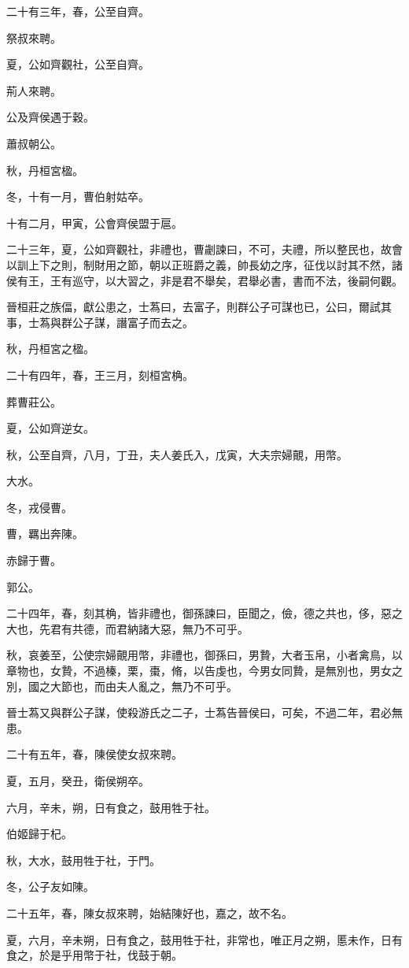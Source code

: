 \begin{pinyinscope}
二十有三年，春，公至自齊。

祭叔來聘。

夏，公如齊觀社，公至自齊。

荊人來聘。

公及齊侯遇于穀。

蕭叔朝公。

秋，丹桓宮楹。

冬，十有一月，曹伯射姑卒。

十有二月，甲寅，公會齊侯盟于扈。

二十三年，夏，公如齊觀社，非禮也，曹劌諫曰，不可，夫禮，所以整民也，故會以訓上下之則，制財用之節，朝以正班爵之義，帥長幼之序，征伐以討其不然，諸侯有王，王有巡守，以大習之，非是君不舉矣，君舉必書，書而不法，後嗣何觀。

晉桓莊之族偪，獻公患之，士蒍曰，去富子，則群公子可謀也已，公曰，爾試其事，士蒍與群公子謀，譖富子而去之。

秋，丹桓宮之楹。

二十有四年，春，王三月，刻桓宮桷。

葬曹莊公。

夏，公如齊逆女。

秋，公至自齊，八月，丁丑，夫人姜氏入，戊寅，大夫宗婦覿，用幣。

大水。

冬，戎侵曹。

曹，羈出奔陳。

赤歸于曹。

郭公。

二十四年，春，刻其桷，皆非禮也，御孫諫曰，臣聞之，儉，德之共也，侈，惡之大也，先君有共德，而君納諸大惡，無乃不可乎。

秋，哀姜至，公使宗婦覿用幣，非禮也，御孫曰，男贄，大者玉帛，小者禽鳥，以章物也，女贄，不過榛，栗，棗，脩，以告虔也，今男女同贄，是無別也，男女之別，國之大節也，而由夫人亂之，無乃不可乎。

晉士蒍又與群公子謀，使殺游氏之二子，士蒍告晉侯曰，可矣，不過二年，君必無患。

二十有五年，春，陳侯使女叔來聘。

夏，五月，癸丑，衛侯朔卒。

六月，辛未，朔，日有食之，鼓用牲于社。

伯姬歸于杞。

秋，大水，鼓用牲于社，于門。

冬，公子友如陳。

二十五年，春，陳女叔來聘，始結陳好也，嘉之，故不名。

夏，六月，辛未朔，日有食之，鼓用牲于社，非常也，唯正月之朔，慝未作，日有食之，於是乎用幣于社，伐鼓于朝。


\end{pinyinscope}
